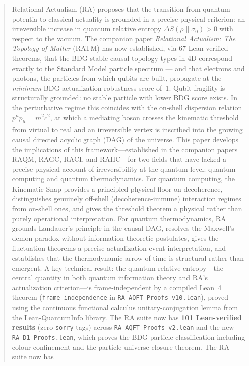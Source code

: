 \documentclass[11pt,a4paper]{article}
\theoremstyle{plain}
\theoremstyle{definition}
\theoremstyle{remark}
\begin{document}
\begin{abstract}
Relational Actualism (RA) proposes that the transition from quantum potentia to
classical actuality is grounded in a precise physical criterion: an irreversible
increase in quantum relative entropy $\Delta S(\rho\|\sigma_0) > 0$ with respect
to the vacuum. The companion paper \emph{Relational Actualism: The Topology of
Matter} (RATM) has now established, via 67 Lean-verified
theorems, that the BDG-stable causal topology types in 4D correspond exactly to
the Standard Model particle spectrum --- and that electrons and photons, the
particles from which qubits are built, propagate at the \emph{minimum} BDG
actualization robustness score of~1. Qubit fragility is structurally grounded:
no stable particle with lower BDG score exists. In the perturbative regime this coincides with the on-shell
dispersion relation $p^\mu p_\mu = m^2c^2$, at which a mediating boson crosses
the kinematic threshold from virtual to real and an irreversible vertex is
inscribed into the growing causal directed acyclic graph (DAG) of the universe. This paper develops the implications of this framework---established in
the companion papers RAQM, RAGC, RACI, and RAHC---for two fields that have lacked a
precise physical account of irreversibility at the quantum level: quantum computing
and quantum thermodynamics. For quantum computing, the Kinematic Snap provides a
principled physical floor on decoherence, distinguishes genuinely off-shell
(decoherence-immune) interaction regimes from on-shell ones, and gives the
threshold theorem a physical rather than purely operational interpretation. For
quantum thermodynamics, RA grounds Landauer's principle in the causal DAG,
resolves the Maxwell's demon paradox without information-theoretic postulates,
gives the fluctuation theorems a precise actualization-event interpretation, and
establishes that the thermodynamic arrow of time is structural rather than
emergent. A key technical result: the quantum relative entropy---the central
quantity in both quantum information theory and RA's actualization
criterion---is frame-independent by a compiled Lean~4 theorem
(\texttt{frame\_independence} in \texttt{RA\_AQFT\_Proofs\_v10.lean}), proved
using the continuous functional calculus unitary-conjugation lemma from the
Lean-QuantumInfo library. The RA suite now has
\textbf{101 Lean-verified results} (zero \texttt{sorry} tags) across
\texttt{RA\_AQFT\_Proofs\_v2.lean} and the new \texttt{RA\_D1\_Proofs.lean},
which proves the BDG particle classification including colour confinement
and the particle universe closure theorem. The RA suite now has

\end{abstract}
\end{document}
